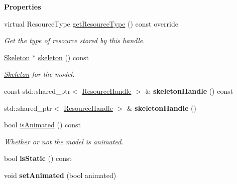 \begin{Indent}\textbf{ Properties}\par
\begin{DoxyCompactItemize}
\item 
\mbox{\label{classrev_1_1_model_af975ef78a207074b67f5ba2560472c36}} 
virtual Resource\+Type \mbox{\hyperlink{classrev_1_1_model_af975ef78a207074b67f5ba2560472c36}{get\+Resource\+Type}} () const override
\begin{DoxyCompactList}\small\item\em Get the type of resource stored by this handle. \end{DoxyCompactList}\item 
\mbox{\label{classrev_1_1_model_a5dd57a4b155f375bb309651825462745}} 
\mbox{\hyperlink{classrev_1_1_skeleton}{Skeleton}} $\ast$ \mbox{\hyperlink{classrev_1_1_model_a5dd57a4b155f375bb309651825462745}{skeleton}} () const
\begin{DoxyCompactList}\small\item\em \mbox{\hyperlink{classrev_1_1_skeleton}{Skeleton}} for the model. \end{DoxyCompactList}\item 
\mbox{\label{classrev_1_1_model_a60bfad5b7e4cabf706832c714f88c666}} 
const std\+::shared\+\_\+ptr$<$ \mbox{\hyperlink{classrev_1_1_resource_handle}{Resource\+Handle}} $>$ \& {\bfseries skeleton\+Handle} () const
\item 
\mbox{\label{classrev_1_1_model_a447dba9ff21a493184e6b7568ef69726}} 
std\+::shared\+\_\+ptr$<$ \mbox{\hyperlink{classrev_1_1_resource_handle}{Resource\+Handle}} $>$ \& {\bfseries skeleton\+Handle} ()
\item 
\mbox{\label{classrev_1_1_model_a410010f89a4ecce5b0f244bf0c71634f}} 
bool \mbox{\hyperlink{classrev_1_1_model_a410010f89a4ecce5b0f244bf0c71634f}{is\+Animated}} () const
\begin{DoxyCompactList}\small\item\em Whether or not the model is animated. \end{DoxyCompactList}\item 
\mbox{\label{classrev_1_1_model_a2358c427322a564c6032f8e4ca072ba0}} 
bool {\bfseries is\+Static} () const
\item 
\mbox{\label{classrev_1_1_model_a7c5e587f8dce0d1ad0f6c7b826e46c45}} 
void {\bfseries set\+Animated} (bool animated)
\end{DoxyCompactItemize}
\end{Indent}
